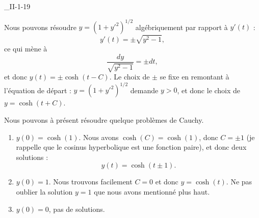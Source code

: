 \begin{corrige}{_II-1-19}
\begin{alternative}
	Nous pouvons résoudre $y=(1+y'^2)^{1/2}$ algébriquement par rapport à $y'(t)$ :
\begin{equation}
	y'(t)=\pm\sqrt{y^2-1},
\end{equation}
ce qui mène à
\begin{equation}
	\frac{ dy }{ \sqrt{y^2-1} }=\pm dt,
\end{equation}
et donc $y(t)=\pm\cosh(t-C)$. Le choix de $\pm$ se fixe en remontant à l'équation de départ : $y=(1+y'^2)^{1/2}$ demande $y>0$, et donc le choix de $y=\cosh(t+C)$. 
\end{alternative}

Nous pouvons à présent résoudre quelque problèmes de Cauchy.

\begin{enumerate}

\item 
$y(0)=\cosh(1)$. Nous avons $\cosh(C)=\cosh(1)$, donc $C=\pm 1$ (je rappelle que le cosinus hyperbolique est une fonction paire), et donc deux solutions :
\begin{equation}
	y(t)=\cosh(t\pm 1).
\end{equation}

\item
$y(0)=1$. Nous trouvons facilement $C=0$ et donc $y=\cosh(t)$. Ne pas oublier la solution $y=1$ que nous avons mentionné plus haut.

\item
$y(0)=0$, pas de solutions.

\end{enumerate}


\end{corrige}
